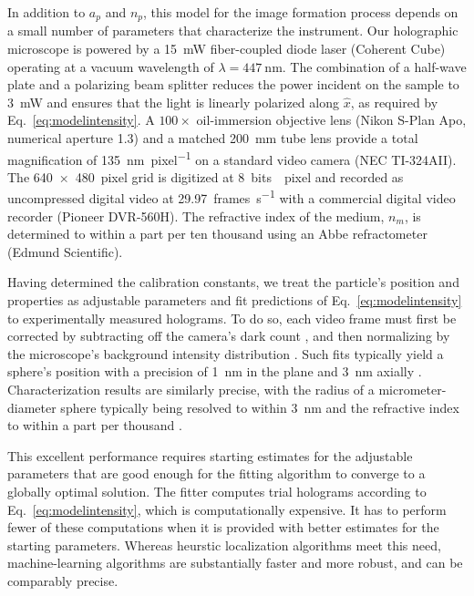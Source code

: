 In addition to $a_p$ and $n_p$, this model for the
image formation process depends on a small number of
parameters that characterize the instrument.
Our holographic microscope is powered by
a \SI{15}{\milli\watt} fiber-coupled diode laser (Coherent Cube)
operating at a vacuum wavelength of 
$\lambda = \SI{447}{\nm}$.  
The combination of a half-wave plate and a polarizing 
beam splitter reduces the
power incident on the sample to \SI{3}{\milli\watt} and ensures
that the light is linearly polarized along $\hat{x}$,
as required by Eq.~\eqref{eq:modelintensity}.
A $100\times$ oil-immersion objective lens
(Nikon S-Plan Apo, numerical aperture 1.3) and a matched \SI{200}{\mm}
tube lens provide a total magnification of \SI{135}{\nm\per pixel}
on a standard video camera (NEC TI-324AII). The 
\SI{640 x 480}{pixel} grid is digitized at \SI{8}{bits \per pixel} 
and recorded as uncompressed digital video at 
\SI{29.97}{frames\per\second} with a commercial digital video 
recorder (Pioneer DVR-560H).  The refractive 
index of the medium, $n_m$, is determined to within a part 
per ten thousand using an Abbe refractometer (Edmund Scientific).

Having determined the calibration constants,
we treat the particle's position and properties as 
adjustable parameters and fit predictions of
Eq.~\eqref{eq:modelintensity} to experimentally measured holograms.
To do so, each video frame must first be 
corrected by subtracting off the camera's dark count 
\cite{wang16a}, and then
normalizing by the microscope's background intensity distribution \cite{lee07a}. 
Such fits typically yield a sphere's position with a precision of 
\SI{1}{\nm} in the plane and \SI{3}{\nm} axially 
\cite{cheong09,cheong10a}. 
Characterization results are similarly precise, 
with the radius of a micrometer-diameter sphere typically 
being resolved to within \SI{3}{\nm} and the refractive index to 
within a part per thousand \cite{krishnatreya14,shpaisman12}.

This excellent performance requires starting 
estimates for the adjustable parameters that are
good enough for the fitting 
algorithm to converge to a globally optimal solution. 
The fitter computes trial holograms according to
Eq.~\eqref{eq:modelintensity}, which is computationally 
expensive.
It has to perform fewer of these computations when it is
provided with better estimates for the starting parameters.
Whereas heurstic localization algorithms meet this need,
machine-learning algorithms are substantially faster and
more robust, and can be comparably precise.

